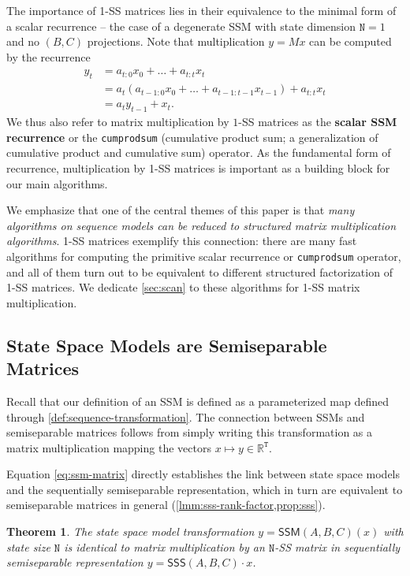 \documentclass{article}
\newtheorem{theorem}{Theorem}[section]
\newcommand{\R}{\mathbb{R}}
\begin{document}
The importance of 1-SS matrices lies in their equivalence to the minimal form of a scalar recurrence -- the case of a degenerate SSM with state dimension $\mathtt{N}=1$ and no $(B, C)$ projections.
Note that multiplication $y = Mx$ can be computed by the recurrence
\begin{equation}
  \label{eq:1ss-recurrence}
  \begin{aligned}
    y_t &= a_{t:0}x_0 + \dots + a_{t:t}x_t \\
        &= a_t \left(a_{t-1:0}x_0 + \dots + a_{t-1:t-1}x_{t-1}\right) + a_{t:t}x_t \\
        &= a_t y_{t-1} + x_t
        .
  \end{aligned}
\end{equation}
We thus also refer to matrix multiplication by $1$-SS matrices as the \textbf{scalar SSM recurrence} or the \texttt{cumprodsum} (cumulative product sum; a generalization of cumulative product and cumulative sum) operator.
As the fundamental form of recurrence, multiplication by 1-SS matrices is important
as a building block for our main algorithms.

We emphasize that one of the central themes of this paper is that \emph{many algorithms on sequence models can be reduced to structured matrix multiplication algorithms}.
1-SS matrices exemplify this connection: there are many fast algorithms for computing the primitive scalar recurrence or \texttt{cumprodsum} operator,
and all of them turn out to be equivalent to different structured factorization of 1-SS matrices.
We dedicate \cref{sec:scan} to these algorithms for 1-SS matrix multiplication.

\subsection{State Space Models are Semiseparable Matrices}
Recall that our definition of an SSM is defined as a parameterized map
defined through \cref{def:sequence-transformation}.
The connection between SSMs and semiseparable matrices follows from simply writing this transformation as a matrix multiplication mapping the vectors $x \mapsto y \in \R^\mathtt{T}$.

Equation \eqref{eq:ssm-matrix} directly establishes the link between state space models and the sequentially semiseparable representation, which in turn are equivalent to semiseparable matrices in general (\cref{lmm:sss-rank-factor,prop:sss}).
\begin{theorem}
  \label{thm:ssm-sss}
  The state space model transformation $y = \mathsf{SSM}(A, B, C)(x)$ with state size $\mathtt{N}$ is identical to matrix multiplication by an $\mathtt{N}$-SS matrix in sequentially semiseparable representation $y = \mathsf{SSS}(A, B, C) \cdot x$.
\end{theorem}
\end{document}
